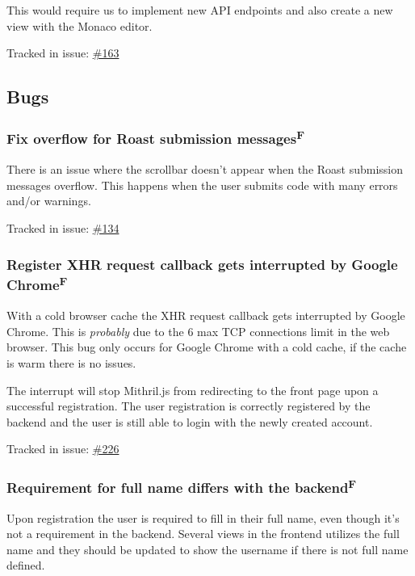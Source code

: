 \documentclass[12pt,a4paper]{report}
\begin{document}
This would require us to implement new API endpoints and also create a new view with the Monaco editor.

Tracked in issue: \href{https://github.com/LuleaUniversityOfTechnology/2018-project-roaster/issues/163}{\#163}

\subsection*{Bugs}
\subsubsection{Fix overflow for Roast submission messages\texorpdfstring{\textsuperscript{F}}{}}
There is an issue where the scrollbar doesn't appear when the Roast submission messages overflow. This happens when the user submits code with many errors and/or warnings.

Tracked in issue: \href{https://github.com/LuleaUniversityOfTechnology/2018-project-roaster/issues/134}{\#134}

\subsubsection{Register XHR request callback gets interrupted by Google  Chrome\texorpdfstring{\textsuperscript{F}}{}}
With a cold browser cache the XHR request callback gets interrupted by Google Chrome. This is \textit{probably} due to the 6 max TCP connections limit in the web browser. This bug only occurs for Google Chrome with a cold cache, if the cache is warm there is no issues.

The interrupt will stop Mithril.js from redirecting to the front page upon a successful registration. The user registration is correctly registered by the backend and the user is still able to login with the newly created account.

Tracked in issue: \href{https://github.com/LuleaUniversityOfTechnology/2018-project-roaster/issues/226}{\#226}

\subsubsection{Requirement for full name differs with the backend\texorpdfstring{\textsuperscript{F}}{}}
Upon registration the user is required to fill in their full name, even though it's not a requirement in the backend. Several views in the frontend utilizes the full name and they should be updated to show the username if there is not full name defined.
\end{document}
